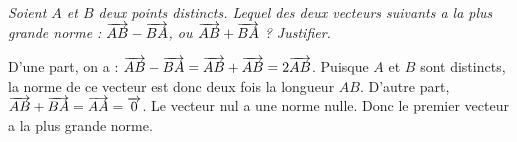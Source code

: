 \documentclass[12pt]{article}
\begin{document}
\begin{exercice}
  \emph{
  Soient $A$ et $B$ deux points distincts. Lequel des deux vecteurs suivants a
  la plus grande norme : $\overrightarrow{AB}-\overrightarrow{BA}$, ou
  $\overrightarrow{AB}+\overrightarrow{BA}$ ? Justifier.
}

D'une part, on a : $\overrightarrow{AB}-\overrightarrow{BA}=\overrightarrow{AB}+\overrightarrow{AB}=2\overrightarrow{AB}$. Puisque $A$ et $B$ sont distincts, la norme de ce vecteur est donc deux fois la longueur $AB$. D'autre part, $\overrightarrow{AB}+\overrightarrow{BA}=\overrightarrow{AA}=\overrightarrow{0}$. Le vecteur nul a une norme nulle. Donc le premier vecteur a la plus grande norme.
\end{exercice}
\end{document}
